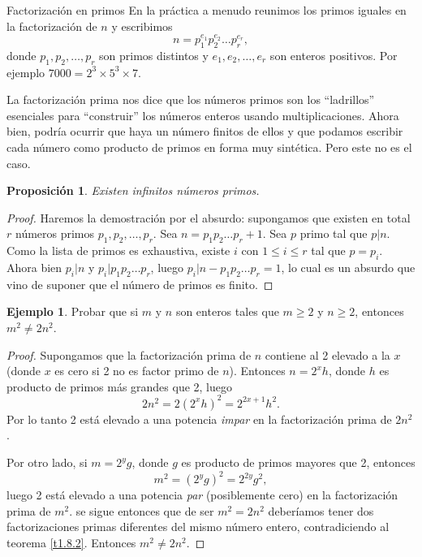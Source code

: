 \documentclass[11pt,spanish,makeidx]{amsbook}
\newtheorem{proposicion}[teorema]{Proposici\'on}
\theoremstyle{definition}
\newtheorem{ejemplo}{Ejemplo}[section]
\theoremstyle{remark}
\begin{document}
\begin{section}{Factorización en primos}
En la práctica a menudo reunimos los primos iguales en la factorización de $n$ y escribimos
\begin{equation}\label{factpri}
n=p_1^{e_1}p_2^{e_2}\ldots p_r^{e_r},
\end{equation}
donde $p_1,p_2,\ldots ,p_r$ son primos distintos y $e_1,e_2,\ldots,e_r$ son enteros positivos. Por ejemplo $ 7000 = 2^3 \times 5^3 \times 7$.

La factorización prima nos dice que los números primos son los  ``ladrillos'' esenciales para ``construir'' los números enteros usando multiplicaciones. Ahora bien, podría ocurrir que haya un número finitos de ellos y que podamos escribir cada número como producto de primos en forma muy sintética. Pero este no es el caso.

\begin{proposicion} Existen infinitos números primos. 
\end{proposicion} 
\begin{proof} Haremos la demostración por el absurdo: supongamos que existen en total $r$ números primos $p_1,p_2,\ldots, p_r$. Sea $n =  p_1p_2\ldots p_r+1$. Sea $p$ primo tal que $p|n$. Como la lista de primos es exhaustiva, existe $i$ con $1 \le i \le r$ tal que $p=p_i$. Ahora bien $p_i| n$ y $p_i|p_1p_2\ldots p_r$, luego $p_i|n-p_1p_2\ldots p_r =1$, lo cual es un absurdo que vino de suponer que el número de primos es finito.  
\end{proof}

\begin{ejemplo} Probar que si $m$ y $n$ son enteros tales que $m\ge 2$ y $n\ge 2$, entonces $m^2 \not=2n^2$.
\end{ejemplo}
\begin{proof} Supongamos que la factorización prima de $n$ contiene al 2 elevado a la $x$ (donde $x$ es cero si 2 no es factor primo de $n$). Entonces $n=2^xh$, donde $h$ es producto de primos más grandes que 2, luego
$$
2n^2=2(2^xh)^2= 2^{2x+1}h^2.
$$
Por lo tanto 2 está elevado a una potencia {\it impar} en la factorización prima de $2n^2$.

Por otro lado, si $m=2^yg$, donde $g$ es producto de primos mayores que 2, entonces
$$
m^2= (2^yg)^2 = 2^{2y}g^2,
$$
luego 2 está elevado a una potencia {\it par} (posiblemente cero) en la factorización prima de $m^2$. se sigue entonces que de ser $m^2 = 2n^2$ deberíamos tener dos factorizaciones primas diferentes del mismo número entero, contradiciendo al teorema \ref{t1.8.2}. Entonces $m^2 \not= 2n^2$.
\end{proof}


\end{section}
\end{document}
